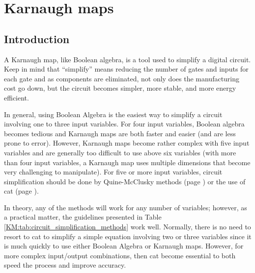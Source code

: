 \chapter{Karnaugh maps}\label{ch06}

\section{Introduction}


A Karnaugh map, like Boolean algebra, is a tool used to simplify a digital circuit. Keep in mind that ``simplify'' means reducing the number of gates and inputs for each gate and as components are eliminated, not only does the manufacturing cost go down, but the circuit becomes simpler, more stable, and more energy efficient. 

In general, using Boolean Algebra is the easiest way to simplify a circuit involving one to three input variables. For four input variables, Boolean algebra becomes tedious and Karnaugh maps are both faster and easier (and are less prone to error). However, Karnaugh maps become rather complex with five input variables and are generally too difficult to use above six variables (with more than four input variables, a Karnaugh map uses multiple dimensions that become very challenging to manipulate). For five or more input variables, circuit simplification should be done by Quine-McClusky methods  (page \pageref{ASM:sec:quine-mccluskey_simplification_method}) or the use of \gls{cat} (page \pageref{ASM:sec:automated_tools}).

In theory, any of the methods will work for any number of variables; however, as a practical matter, the guidelines presented in Table \ref{KM:tab:circuit_simplification_methods} work well. Normally, there is no need to resort to \gls{cat} to simplify a simple equation involving two or three variables since it is much quickly to use either Boolean Algebra or Karnaugh maps. However, for more complex input/output combinations, then \gls{cat} become essential to both speed the process and improve accuracy. 

